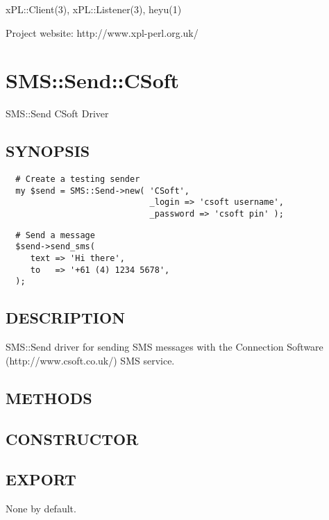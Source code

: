 xPL::Client(3), xPL::Listener(3), heyu(1)



Project website: http://www.xpl-perl.org.uk/

\section{SMS::Send::CSoft\label{SMS::Send::CSoft}}


SMS::Send CSoft Driver

\subsection*{SYNOPSIS\label{SMS::Send::CSoft_SYNOPSIS}}
\begin{verbatim}
  # Create a testing sender
  my $send = SMS::Send->new( 'CSoft',
                             _login => 'csoft username',
                             _password => 'csoft pin' );
\end{verbatim}
\begin{verbatim}
  # Send a message
  $send->send_sms(
     text => 'Hi there',
     to   => '+61 (4) 1234 5678',
  );
\end{verbatim}
\subsection*{DESCRIPTION\label{SMS::Send::CSoft_DESCRIPTION}}


SMS::Send driver for sending SMS messages with the Connection
Software (http://www.csoft.co.uk/) SMS service.

\subsection*{METHODS\label{SMS::Send::CSoft_METHODS}}
\subsection*{CONSTRUCTOR\label{SMS::Send::CSoft_CONSTRUCTOR}}
\subsection*{EXPORT\label{SMS::Send::CSoft_EXPORT}}


None by default.

